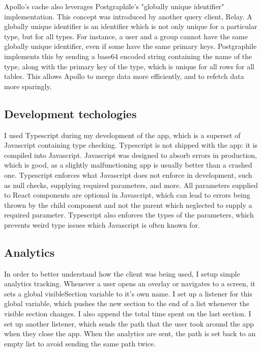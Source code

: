 \documentclass{l4proj}
\begin{document}
Apollo's cache also leverages Postgraphile's "globally unique identifier" implementation. This concept was introduced by another query client, Relay. A globally unique identifier is an identifier which is not only unique for a particular type, but for all types. For instance, a user and a group cannot have the same globally unique identifier, even if some have the same primary keys. Postgraphile implements this by sending a base64 encoded string containing the name of the type, along with the primary key of the type, which is unique for all rows for all tables. This allows Apollo to merge data more efficiently, and to refetch data more sparingly.


\subsection{Development techologies}
I used Typescript during my development of the app, which is a superset of Javascript containing type checking. Typescript is not shipped with the app: it is compiled into Javascript. Javascript was designed to absorb errors in production, which is good, as a slightly malfunctioning app is usually better than a crashed one. Typescript enforces what Javascript does not enforce in development, such as null checks, supplying required parameters, and more. All parameters supplied to React components are optional in Javascript, which can lead to errors being thrown by the child component and not the parent which neglected to supply a required parameter. Typescript also enforces the types of the parameters, which prevents weird type issues which Javascript is often known for.

\subsection{Analytics}
In order to better understand how the client was being used, I setup simple analytics tracking. Whenever a user opens an overlay or navigates to a screen, it sets a global visibleSection variable to it's own name. I set up a listener for this global variable, which pushes the new section to the end of a list whenever the visible section changes. I also append the total time spent on the last section. I set up another listener, which sends the path that the user took around the app when they close the app. When the analytics are sent, the path is set back to an empty list to avoid sending the same path twice.
\end{document}
